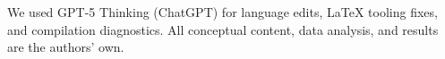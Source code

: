 We used GPT-5 Thinking (ChatGPT) for language edits, LaTeX tooling fixes, and
compilation diagnostics. All conceptual content, data analysis, and results are the authors' own.
